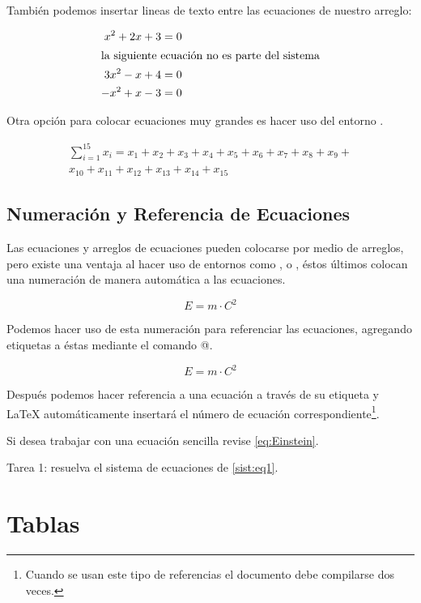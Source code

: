 \documentclass[letterpaper,12pt]{book}
\begin{document}
También podemos insertar lineas de texto entre las ecuaciones de
nuestro arreglo:

\begin{align}
	x^2 + 2x + 3 &= 0 \\
	\intertext{la siguiente ecuación no es parte del sistema}
	3x^2 - x + 4 &= 0 \nonumber \\
	-x^2 + x - 3 &= 0
\end{align}

Otra opción para colocar ecuaciones muy grandes es hacer uso del
entorno \verb@multline@.

\begin{multline}
 \sum_{i=1}^{15} x_i = x_1 + x_2 + x_3 + x_4 + x_5 + x_6 + x_7 + 	
 	x_8 + x_9 + \\
 	 x_{10} + x_{11} + x_{12} + x_{13} + x_{14} + x_{15}
\end{multline}

\section{Numeración y Referencia de Ecuaciones}

Las ecuaciones y arreglos de ecuaciones pueden colocarse por medio de arreglos, pero existe una ventaja
al hacer uso de entornos como \verb@equation@, \verb@align@ o \verb@aligned@, éstos últimos colocan una
numeración de manera automática a las ecuaciones.

\begin{equation}
	E = m\cdot C^2
\end{equation}

Podemos hacer uso de esta numeración para referenciar las ecuaciones, agregando etiquetas a éstas mediante
el comando \verb@\label{}@.

\begin{equation} \label{eq:Einstein}
	E = m\cdot C^2
\end{equation}

Después podemos hacer referencia a una ecuación a través de su etiqueta y \LaTeX{} automáticamente insertará
el número de ecuación correspondiente\footnote{Cuando se usan este tipo de referencias el documento debe 
compilarse dos veces.}.

Si desea trabajar con una ecuación sencilla revise \eqref{eq:Einstein}.

Tarea 1: resuelva el sistema de ecuaciones de \eqref{sist:eq1}.

\newpage

\chapter{Tablas}
\end{document}
